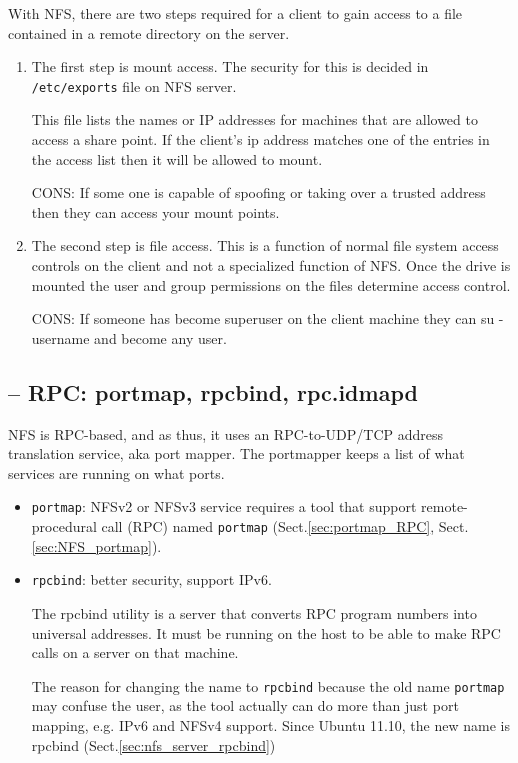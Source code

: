 With NFS, there are two steps required for a client to gain access to a file
contained in a remote directory on the server. 
\begin{enumerate}
  \item  The first step is mount access.
The security for this is decided in \verb!/etc/exports! file on NFS server.

This file lists the names or IP addresses for machines that are allowed to
access a share point. If the client's ip address matches one of the entries in
the access list then it will be allowed to mount.

CONS: If some one is capable of spoofing or taking over a trusted address then
they can access your mount points.

  \item The second step is file access. This is a function of normal file system
  access controls on the client and not a specialized function of NFS. Once the
  drive is mounted the user and group permissions on the files determine access
  control.  
  
CONS: If someone has become superuser on the client machine they can su -
username and become any user.
\end{enumerate}

\subsection{-- RPC: portmap, rpcbind, rpc.idmapd}

NFS is RPC-based, and as thus, it uses an RPC-to-UDP/TCP address translation
service, aka port mapper. The portmapper keeps a list of what services are
running on what ports.

\begin{itemize}
  \item  \verb!portmap!: NFSv2 or NFSv3 service requires a
tool that support remote-procedural call (RPC) named \verb!portmap!
(Sect.\ref{sec:portmap_RPC}, Sect.\ref{sec:NFS_portmap}).
  

  
  \item  \verb!rpcbind!: better security, support IPv6. 

The rpcbind utility is a server that converts RPC program numbers into
universal addresses.  It must be running on the host to be able to make
RPC calls on a server on that machine. 

The reason for changing the name to \verb!rpcbind! because the old name
\verb!portmap! may confuse the user, as the tool actually can do more than just
port mapping, e.g. IPv6 and NFSv4 support. Since Ubuntu 11.10, the new name
is rpcbind (Sect.\ref{sec:nfs_server_rpcbind})
  

\end{itemize}

